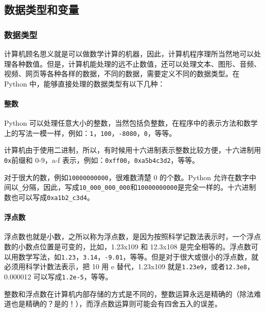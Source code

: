 \hypertarget{ux6570ux636eux7c7bux578bux548cux53d8ux91cf}{%
\subsection{数据类型和变量}\label{ux6570ux636eux7c7bux578bux548cux53d8ux91cf}}

\hypertarget{ux6570ux636eux7c7bux578b}{%
\subsubsection{数据类型}\label{ux6570ux636eux7c7bux578b}}

计算机顾名思义就是可以做数学计算的机器，因此，计算机程序理所当然地可以处理各种数值。但是，计算机能处理的远不止数值，还可以处理文本、图形、音频、视频、网页等各种各样的数据，不同的数据，需要定义不同的数据类型。在
Python 中，能够直接处理的数据类型有以下几种：

\hypertarget{ux6574ux6570}{%
\paragraph{整数}\label{ux6574ux6570}}

Python
可以处理任意大小的整数，当然包括负整数，在程序中的表示方法和数学上的写法一模一样，例如：\texttt{1}，\texttt{100}，\texttt{-8080}，\texttt{0}，等等。

计算机由于使用二进制，所以，有时候用十六进制表示整数比较方便，十六进制用\texttt{0x}前缀和
0-9，a-f 表示，例如：\texttt{0xff00}，\texttt{0xa5b4c3d2}，等等。

对于很大的数，例如\texttt{10000000000}，很难数清楚 0 的个数。Python
允许在数字中间以\texttt{\_}分隔，因此，写成\texttt{10\_000\_000\_000}和\texttt{10000000000}是完全一样的。十六进制数也可以写成\texttt{0xa1b2\_c3d4}。

\hypertarget{ux6d6eux70b9ux6570}{%
\paragraph{浮点数}\label{ux6d6eux70b9ux6570}}

浮点数也就是小数，之所以称为浮点数，是因为按照科学记数法表示时，一个浮点数的小数点位置是可变的，比如，1.23x109
和 12.3x108
是完全相等的。浮点数可以用数学写法，如\texttt{1.23}，\texttt{3.14}，\texttt{-9.01}，等等。但是对于很大或很小的浮点数，就必须用科学计数法表示，把
10 用 e 替代，1.23x109
就是\texttt{1.23e9}，或者\texttt{12.3e8}，0.000012
可以写成\texttt{1.2e-5}，等等。

整数和浮点数在计算机内部存储的方式是不同的，整数运算永远是精确的（除法难道也是精确的？是的！），而浮点数运算则可能会有四舍五入的误差。

